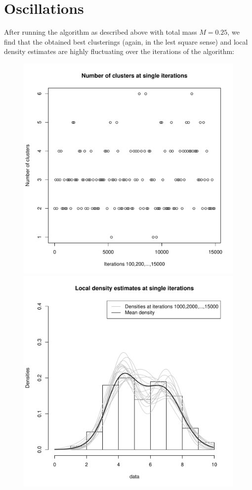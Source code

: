 \section{Oscillations}
After running the algorithm as described above with total mass $M=0.25$, we find that the obtained best clusterings (again, in the lest square sense) and local density estimates are highly fluctuating over the iterations of the algorithm:
\begin{figure}[h]
	\centering
	\begin{minipage}{0.5\textwidth}
		\includegraphics[scale=0.35]{etc/cardinalities_thinned.pdf}
	\end{minipage}%
	\begin{minipage}{0.5\textwidth}
		\includegraphics[scale=0.35]{etc/densities_iters.pdf}
	\end{minipage}
\end{figure}

